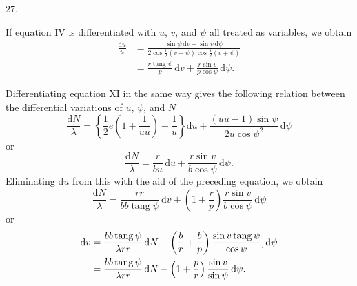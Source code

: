 \par{}
\begin{center}
\hypertarget{native-043-article027}{}27.
\end{center}
If equation IV is differentiated with $u$, $v$, and $\psi$ all treated as variables, we obtain
\[
\begin{aligned}
\frac{\mathrm{d}u}{u}&=\frac{\sin\psi\,\mathrm{d}v+\sin v\,\mathrm{d}\psi}{2\cos\frac{1}{2}(v-\psi)\cos\frac{1}{2}(v+\psi)}\\
&=\frac{r\operatorname{tang}\psi}{p}\,\mathrm{d}v+\frac{r\sin v}{p\cos\psi}\,\mathrm{d}\psi.
\end{aligned}
\]

Differentiating equation XI in the same way gives the following relation between the differential variations of $u$, $\psi$, and $N$
\[
\frac{\mathrm{d}N}{\lambda}=\left\{\frac{1}{2}e\left(1+\frac{1}{uu}\right)-\frac{1}{u}\right\}\mathrm{d}u+\frac{(uu-1)\sin\psi}{2u\cos\psi^2}\,\mathrm{d}\psi
\]
or
\[
\frac{\mathrm{d}N}{\lambda}=\frac{r}{bu}\,\mathrm{d}u+\frac{r\sin v}{b\cos\psi}\,\mathrm{d}\psi.
\]
Eliminating $\mathrm{d}u$ from this with the aid of the preceding equation, we obtain
\[
\frac{\mathrm{d}N}{\lambda}=\frac{rr}{bb\operatorname{tang}\psi}\,\mathrm{d}v+\left(1+\frac{r}{p}\right)\frac{r\sin v}{b\cos\psi}\,\mathrm{d}\psi
\]
or
\[
\begin{aligned}
\mathrm{d}v&=\frac{bb\operatorname{tang}\psi}{\lambda rr}\,\mathrm{d}N-\left(\frac{b}{r}+\frac{b}{p}\right)\frac{\sin v\operatorname{tang}\psi}{\cos\psi}\raisebox{-.6ex}{.}\,\mathrm{d}\psi\\
&=\frac{bb\operatorname{tang}\psi}{\lambda rr}\,\mathrm{d}N-\left(1+\frac{p}{r}\right)\frac{\sin v}{\sin\psi}\,\mathrm{d}\psi.
\end{aligned}
\]

